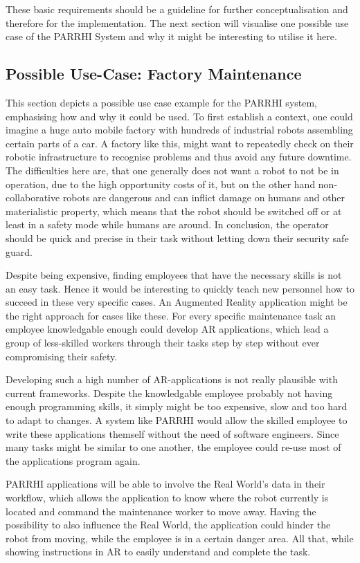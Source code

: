 These basic requirements should be a guideline for further conceptualisation and therefore for the implementation. The next section will visualise one possible use case of the PARRHI System and why it might be interesting to utilise it here.

\subsection{Possible Use-Case: Factory Maintenance}\label{Section:UseCaseDefinition}
This section depicts a possible use case example for the PARRHI system, emphasising how and why it could be used. To first establish a context, one could imagine a huge auto mobile factory with hundreds of industrial robots assembling certain parts of a car. A factory like this, might want to repeatedly check on their robotic infrastructure to recognise problems and thus avoid any future downtime. The difficulties here are, that one generally does not want a robot to not be in operation, due to the high opportunity costs of it, but on the other hand non-collaborative robots are dangerous and can inflict damage on humans and other materialistic property, which means that the robot should be switched off or at least in a safety mode while humans are around. In conclusion, the operator should be quick and precise in their task without letting down their security safe guard.

Despite being expensive, finding employees that have the necessary skills is not an easy task. Hence it would be interesting to quickly teach new personnel how to succeed in these very specific cases. An Augmented Reality application might be the right approach for cases like these. For every specific maintenance task an employee knowledgable enough could develop AR applications, which lead a group of less-skilled workers through their tasks step by step without ever compromising their safety.

Developing such a high number of AR-applications is not really plausible with current frameworks. Despite the knowledgable employee probably not having enough programming skills, it simply might be too expensive, slow and too hard to adapt to changes. A system like PARRHI would allow the skilled employee to write these applications themself without the need of software engineers. Since many tasks might be similar to one another, the employee could re-use most of the applications program again. 

PARRHI applications will be able to involve the Real World's data in their workflow, which allows the application to know where the robot currently is located and command the maintenance worker to move away. Having the possibility to also influence the Real World, the application could hinder the robot from moving, while the employee is in a certain danger area. All that, while showing instructions in AR to easily understand and complete the task.

